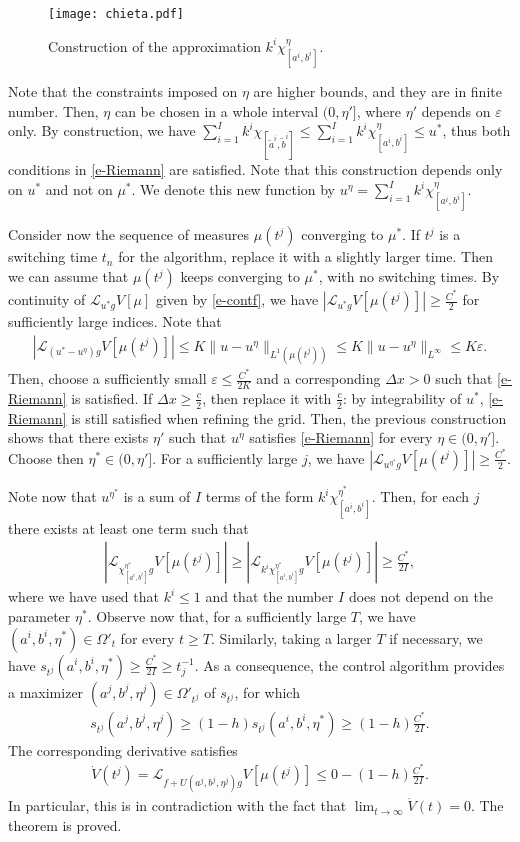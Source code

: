 \documentclass{article}
\newcommand{\dx}{\Delta x}
\renewcommand{\L}{\mathcal{L}}
\theoremstyle{definition}\newtheorem{remark}{Remark}
\newcommand{\eps}{\varepsilon}
\newcommand{\bqn}{\begin{eqnarray}}
\newcommand{\eqnn}{\nonumber\end{eqnarray}}
\renewcommand{\r}[1]{\eqref{#1}}
\begin{document}
\begin{figure}[ht]
\begin{center}
\texttt{[image: chieta.pdf]}
\caption{Construction of the approximation $k^i\chi^\eta_{[a^i,b^i]}$. }
\label{fig:chieta}
\end{center}
\end{figure}

Note that the constraints imposed on $\eta$ are higher bounds, and they are in finite number. Then, $\eta$ can be chosen in a whole interval $(0,\eta']$, where $\eta'$ depends on $\eps$ only. By construction, we have $\sum_{i=1}^I k^i\chi_{[\tilde a^i,\tilde b^i]}\leq \sum_{i=1}^I k^i\chi^\eta_{[ a^i, b^i]}\leq u^*$, thus both conditions in \r{e-Riemann} are satisfied. Note that this construction depends only on  $u^*$ and not on $\mu^*$. We denote this new function by $u^\eta=\sum_{i=1}^I k^i\chi^\eta_{[ a^i, b^i]}$. 

Consider now the sequence of measures $\mu(t^j)$ converging to $\mu^*$. If $t^j$ is a switching time $t_n$ for the algorithm, replace it with a slightly larger time. Then we can assume that  $\mu(t^j)$ keeps converging to $\mu^*$, with no switching times. By continuity of $\L_{u^*g}V[\mu]$ given by \r{e-contf}, we have $|\L_{u^*g}V[\mu(t^j)]|\geq \frac{C^*}2$ for sufficiently large indices. Note that 
\bqn
|\L_{(u^*-u^\eta)g}V[\mu(t^j)]|\leq K \|u-u^\eta\|_{L^1(\mu(t^j))}\leq K\|u-u^\eta\|_{L^\infty} \leq K \eps.
\eqnn
Then, choose a sufficiently small $\eps\leq \frac{C^*}{2K}$ and a corresponding $\dx>0$ such that \r{e-Riemann} is satisfied. If $\dx\geq \frac{c}2$, then replace it with $\frac{c}2$: by integrability of $u^*$, \r{e-Riemann} is still satisfied when refining the grid. Then, the previous construction shows that there exists $\eta'$ such that $u^\eta$ satisfies \r{e-Riemann} for every $\eta\in(0,\eta']$. Choose then $\eta^*\in(0,\eta']$. For a sufficiently large $j$, we have $
|\L_{u^{\eta^*} g}V[\mu(t^j)]|\geq \frac{C^*}2$.

Note now that $u^{\eta^*}$ is a sum of $I$ terms of the form $k^i\chi^{\eta^*}_{[ a^i, b^i]}$. Then, for each $j$ there exists at least one term such that 
\bqn
|\L_{\chi^{\eta^*}_{[ a^i, b^i]} g}V[\mu(t^j)]|\geq |\L_{k^i\chi^{\eta^*}_{[ a^i, b^i]} g}V[\mu(t^j)]|\geq \frac{C^*}{2I},
\eqnn
where we have used that $k^i\leq 1$ and that the number $I$ does not depend on the parameter $\eta^*$. Observe now that, for a sufficiently large $T$, we have $(a^i,b^i,\eta^*)\in\Omega'_t$ for every $t\geq T$. Similarly, taking a larger $T$ if necessary, we have $s_{t^j}(a^i,b^i,\eta^*)\geq  \frac{C^*}{2I}\geq t_j^{-1}$. As a consequence, the control algorithm provides a maximizer $(a^j,b^j,\eta^j)\in \Omega'_{t^j}$ of $s_{t^j}$, for which
\bqn
s_{t^j}(a^j,b^j,\eta^j)\geq (1-h)s_{t^j}(a^i,b^i,\eta^*)\geq (1-h)\frac{C^*}{2I}. %
\eqnn
The corresponding derivative satisfies 
\bqn
\dot V(t^j)=\L_{f+U(a^j,b^j,\eta^j)g}V[\mu(t^j)]\leq 0 - (1-h)\frac{C^*}{2I}. %
\eqnn
In particular, this is in contradiction with the fact that $\lim_{t\to\infty}\dot V(t)=0$.
The theorem is proved.
\end{document}
